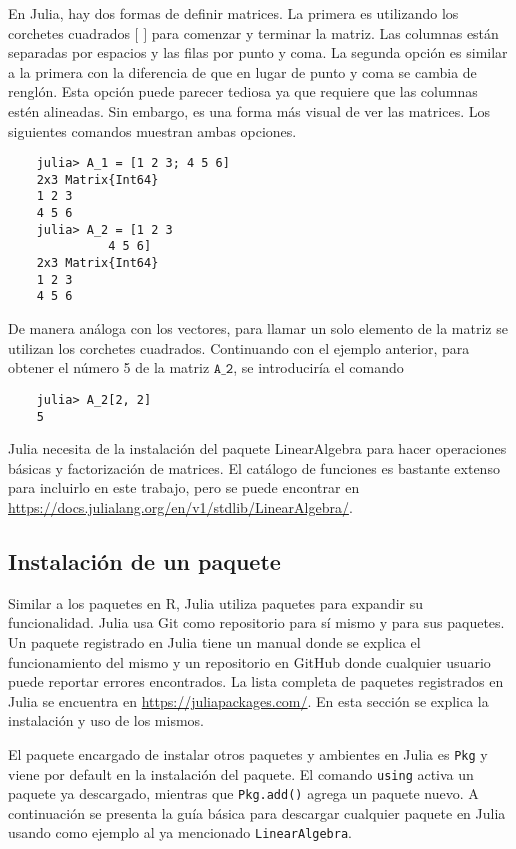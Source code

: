 En \textsf{Julia}, hay dos formas de definir matrices. La primera es utilizando los corchetes cuadrados $[$ $]$ para comenzar y terminar la matriz. Las columnas están separadas por espacios y las filas por punto y coma. La segunda opción es similar a la primera con la diferencia de que en lugar de punto y coma se cambia de renglón. Esta opción puede parecer tediosa ya que requiere que las columnas estén alineadas. Sin embargo, es una forma más visual de ver las matrices. Los siguientes comandos muestran ambas opciones. 

\begin{verbatim}
	julia> A_1 = [1 2 3; 4 5 6]
	2x3 Matrix{Int64}
	1 2 3
	4 5 6
	julia> A_2 = [1 2 3
		      4 5 6]
	2x3 Matrix{Int64}
	1 2 3
	4 5 6

\end{verbatim}

De manera análoga con los vectores, para llamar un solo elemento de la matriz se utilizan los corchetes cuadrados. Continuando con el ejemplo anterior, para obtener el número 5 de la matriz $\texttt{A\_2}$, se introduciría el comando 
\begin{verbatim}
	julia> A_2[2, 2]
	5
\end{verbatim}

\textsf{Julia} necesita de la instalación del paquete \textsf{LinearAlgebra} para hacer operaciones básicas y factorización de matrices. El catálogo de funciones es bastante extenso para incluirlo en este trabajo, pero se puede encontrar en \url{https://docs.julialang.org/en/v1/stdlib/LinearAlgebra/}.

\subsection{Instalación de un paquete} \label{instalacion_paquete}

Similar a los paquetes en \textsf{R}, \textsf{Julia} utiliza paquetes para expandir su funcionalidad. \textsf{Julia} usa \textsf{Git} como repositorio para sí mismo y para sus paquetes. Un paquete registrado en \textsf{Julia} tiene un manual donde se explica el funcionamiento del mismo y un repositorio en \textsf{GitHub} donde cualquier usuario puede reportar errores encontrados. La lista completa de paquetes registrados en \textsf{Julia} se encuentra en \url{https://juliapackages.com/}. En esta sección se explica la instalación y uso de los mismos. 

El paquete encargado de instalar otros paquetes y ambientes en \textsf{Julia} es \texttt{Pkg} y viene por default en la instalación del paquete. El comando \texttt{using} activa un paquete ya descargado, mientras que \texttt{Pkg.add()} agrega un paquete nuevo. A continuación se presenta la guía básica para descargar cualquier paquete en \textsf{Julia} usando como ejemplo al ya mencionado \texttt{LinearAlgebra}. 


